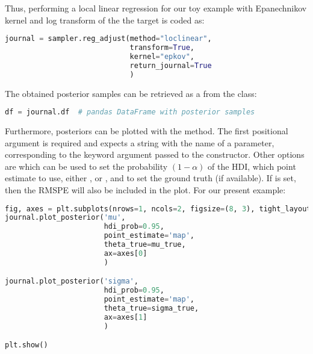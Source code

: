 Thus, performing a local linear regression for our toy example with Epanechnikov kernel and log transform of the the target is coded as: 

\begin{lstlisting}[language=python]
journal = sampler.reg_adjust(method="loclinear",
                             transform=True,
                             kernel="epkov",
                             return_journal=True
                             )
\end{lstlisting}

The obtained posterior samples can be retrieved as a  from the  class:

\begin{lstlisting}[language=python]
df = journal.df  # pandas DataFrame with posterior samples
\end{lstlisting}

Furthermore, posteriors can be plotted with the  method. The first positional argument is required and expects a string with the name of a parameter, corresponding to the  keyword argument passed to the  constructor. Other options are  which can be used to set the probability $(1-\alpha)$ of the HDI,  which point estimate to use, either ,  or , and  to set the ground truth (if available). If  is set, then the RMSPE will also be included in the plot. For our present example: 

\begin{lstlisting}[language=python]
fig, axes = plt.subplots(nrows=1, ncols=2, figsize=(8, 3), tight_layout=True)
journal.plot_posterior('mu',
                       hdi_prob=0.95,
                       point_estimate='map',
                       theta_true=mu_true,
                       ax=axes[0]
                       )

journal.plot_posterior('sigma',
                       hdi_prob=0.95,
                       point_estimate='map',
                       theta_true=sigma_true,
                       ax=axes[1]
                       )

plt.show()
\end{lstlisting}


